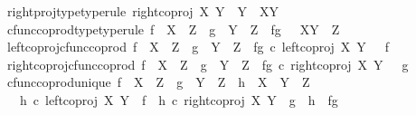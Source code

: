 \begin{isabellebody}
\ \ right{\isacharunderscore}{\kern0pt}proj{\isacharunderscore}{\kern0pt}type{\isacharbrackleft}{\kern0pt}type{\isacharunderscore}{\kern0pt}rule{\isacharbrackright}{\kern0pt}{\isacharcolon}{\kern0pt}\ {\isachardoublequoteopen}right{\isacharunderscore}{\kern0pt}coproj\ X\ Y\ {\isacharcolon}{\kern0pt}\ Y\ {\isasymrightarrow}\ X{\isasymCoprod}Y{\isachardoublequoteclose}\ \isanewline
\ \ cfunc{\isacharunderscore}{\kern0pt}coprod{\isacharunderscore}{\kern0pt}type{\isacharbrackleft}{\kern0pt}type{\isacharunderscore}{\kern0pt}rule{\isacharbrackright}{\kern0pt}{\isacharcolon}{\kern0pt}\ {\isachardoublequoteopen}f\ {\isacharcolon}{\kern0pt}\ X\ {\isasymrightarrow}\ Z\ {\isasymLongrightarrow}\ g\ {\isacharcolon}{\kern0pt}\ Y\ {\isasymrightarrow}\ Z\ {\isasymLongrightarrow}\ f{\isasymamalg}g\ {\isacharcolon}{\kern0pt}\ \ X{\isasymCoprod}Y\ {\isasymrightarrow}\ Z{\isachardoublequoteclose}\ \isanewline
\ \ left{\isacharunderscore}{\kern0pt}coproj{\isacharunderscore}{\kern0pt}cfunc{\isacharunderscore}{\kern0pt}coprod{\isacharcolon}{\kern0pt}\ {\isachardoublequoteopen}f\ {\isacharcolon}{\kern0pt}\ X\ {\isasymrightarrow}\ Z\ {\isasymLongrightarrow}\ g\ {\isacharcolon}{\kern0pt}\ Y\ {\isasymrightarrow}\ Z\ {\isasymLongrightarrow}\ f{\isasymamalg}g\ {\isasymcirc}\isactrlsub c\ {\isacharparenleft}{\kern0pt}left{\isacharunderscore}{\kern0pt}coproj\ X\ Y{\isacharparenright}{\kern0pt}\ \ {\isacharequal}{\kern0pt}\ f{\isachardoublequoteclose}\ \isanewline
\ \ right{\isacharunderscore}{\kern0pt}coproj{\isacharunderscore}{\kern0pt}cfunc{\isacharunderscore}{\kern0pt}coprod{\isacharcolon}{\kern0pt}\ {\isachardoublequoteopen}f\ {\isacharcolon}{\kern0pt}\ X\ {\isasymrightarrow}\ Z\ {\isasymLongrightarrow}\ g\ {\isacharcolon}{\kern0pt}\ Y\ {\isasymrightarrow}\ Z\ {\isasymLongrightarrow}\ f{\isasymamalg}g\ {\isasymcirc}\isactrlsub c\ {\isacharparenleft}{\kern0pt}right{\isacharunderscore}{\kern0pt}coproj\ X\ Y{\isacharparenright}{\kern0pt}\ \ {\isacharequal}{\kern0pt}\ g{\isachardoublequoteclose}\ \isanewline
\ \ cfunc{\isacharunderscore}{\kern0pt}coprod{\isacharunderscore}{\kern0pt}unique{\isacharcolon}{\kern0pt}\ {\isachardoublequoteopen}f\ {\isacharcolon}{\kern0pt}\ X\ {\isasymrightarrow}\ Z\ {\isasymLongrightarrow}\ g\ {\isacharcolon}{\kern0pt}\ Y\ {\isasymrightarrow}\ Z\ {\isasymLongrightarrow}\ h\ {\isacharcolon}{\kern0pt}\ X\ {\isasymCoprod}\ Y\ {\isasymrightarrow}\ Z\ {\isasymLongrightarrow}\ \isanewline
\ \ \ \ h\ {\isasymcirc}\isactrlsub c\ left{\isacharunderscore}{\kern0pt}coproj\ X\ Y\ {\isacharequal}{\kern0pt}\ f\ {\isasymLongrightarrow}\ h\ {\isasymcirc}\isactrlsub c\ right{\isacharunderscore}{\kern0pt}coproj\ X\ Y\ {\isacharequal}{\kern0pt}\ g\ {\isasymLongrightarrow}\ h\ {\isacharequal}{\kern0pt}\ f{\isasymamalg}g{\isachardoublequoteclose}\isanewline

\end{isabellebody}
